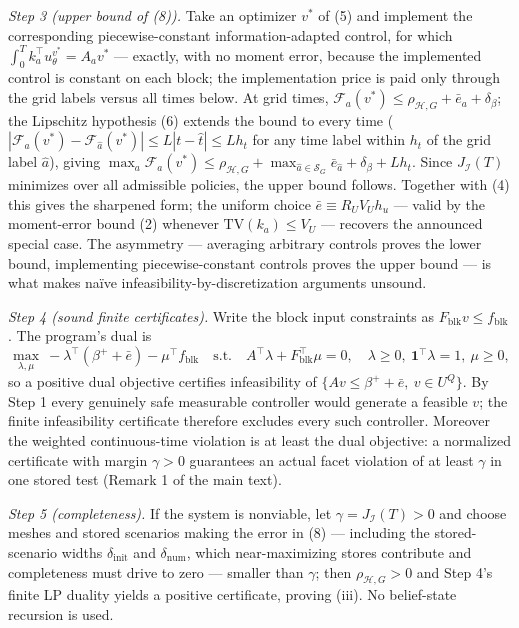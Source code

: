 \documentclass[10pt,article]{article}
\begin{document}
\emph{Step 3 (upper bound of (8)).} Take an optimizer \(v^{*}\) of (5) and
implement the corresponding piecewise-constant information-adapted control,
for which \(\int_0^T k_a^\top u^{v^{*}}_\theta = A_a v^{*}\) --- exactly,
with no moment error, because the implemented control is constant on each
block; the implementation price is paid only through the grid labels
versus all times below. At grid times,
\(\mathcal F_a(v^{*}) \le \rho_{\mathcal H,G} + \bar e_a + \delta_\beta\);
the Lipschitz hypothesis (6) extends the bound to every time
(\(|\mathcal F_a(v^{*}) - \mathcal F_{\hat a}(v^{*})| \le L|t - \hat t|
\le L h_t\) for any time label within \(h_t\) of the grid label
\(\hat a\)), giving
\(\max_a \mathcal F_a(v^{*}) \le \rho_{\mathcal H,G} + \max_{\hat a
\in \mathscr S_G} \bar e_{\hat a} + \delta_\beta + L h_t\). Since
\(J_{\mathcal I}(T)\) minimizes over all
admissible policies, the upper bound follows. Together with (4) this gives
the sharpened form; the uniform choice \(\bar e \equiv R_U V_U h_u\)
--- valid by the moment-error bound (2) whenever \(\mathrm{TV}(k_a) \le
V_U\) --- recovers the announced special case. The asymmetry --- averaging arbitrary controls proves
the lower bound, implementing piecewise-constant controls proves the upper
bound --- is what makes na\"ive infeasibility-by-discretization arguments
unsound.

\emph{Step 4 (sound finite certificates).} Write the block input constraints
as \(F_{\mathrm{blk}} v \le f_{\mathrm{blk}}\). The program's dual is
\[
\max_{\lambda,\mu}\ -\lambda^\top(\beta^{+} + \bar e) - \mu^\top
f_{\mathrm{blk}}
\quad \text{s.t.} \quad
A^\top \lambda + F_{\mathrm{blk}}^\top \mu = 0,\quad
\lambda \ge 0,\ \mathbf 1^\top \lambda = 1,\ \mu \ge 0,
\tag{12}
\]
so a positive dual objective certifies infeasibility of \(\{A v \le
\beta^{+} + \bar e,\ v \in U^{Q}\}\). By Step 1 every genuinely safe
measurable controller would generate a feasible \(v\); the finite
infeasibility certificate therefore excludes every such controller. Moreover
the weighted continuous-time violation is at least the dual objective: a
normalized certificate with margin \(\gamma > 0\) guarantees an actual facet
violation of at least \(\gamma\) in one stored test (Remark 1 of the main
text).

\emph{Step 5 (completeness).} If the system is nonviable, let
\(\gamma = J_{\mathcal I}(T) > 0\) and choose meshes and stored scenarios
making the error in (8) --- including the stored-scenario widths
\(\delta_{\mathrm{init}}\) and \(\delta_{\mathrm{num}}\), which
near-maximizing stores contribute and completeness must drive to zero ---
smaller than \(\gamma\); then \(\rho_{\mathcal H,G} > 0\) and Step 4's
finite LP duality yields a positive certificate, proving (iii). No
belief-state recursion is used.
\end{document}
